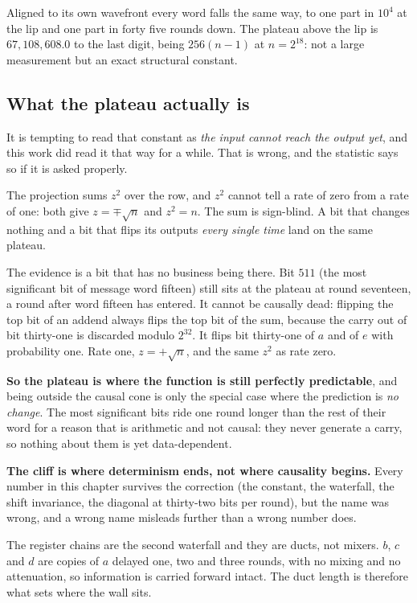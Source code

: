 Aligned to its own wavefront every word falls the same way, to one part in \(10^{4}\) at the lip and
one part in forty five rounds down. The plateau above the lip is \(67{,}108{,}608.0\) to the last
digit, being \(256(n-1)\) at \(n = 2^{18}\): not a large measurement but an exact structural
constant.

\subsection{What the plateau actually is}

It is tempting to read that constant as \emph{the input cannot reach the output yet}, and this work
did read it that way for a while. That is wrong, and the statistic says so if it is asked properly.

The projection sums \(z^{2}\) over the row, and \(z^{2}\) cannot tell a rate of zero from a rate of
one: both give \(z = \mp\sqrt{n}\) and \(z^{2} = n\). The sum is sign-blind. A bit that changes
nothing and a bit that flips its outputs \emph{every single time} land on the same plateau.

The evidence is a bit that has no business being there. Bit \(511\) (the most significant bit of
message word fifteen) still sits at the plateau at round seventeen, a round after word fifteen
has entered. It cannot be causally dead: flipping the top bit of an addend always flips the top bit
of the sum, because the carry out of bit thirty-one is discarded modulo \(2^{32}\). It flips bit
thirty-one of \(a\) and of \(e\) with probability one. Rate one, \(z = +\sqrt{n}\), and the same
\(z^{2}\) as rate zero.

\textbf{So the plateau is where the function is still perfectly predictable}, and being outside the
causal cone is only the special case where the prediction is \emph{no change}. The most significant
bits ride one round longer than the rest of their word for a reason that is arithmetic and not
causal: they never generate a carry, so nothing about them is yet data-dependent.

\textbf{The cliff is where determinism ends, not where causality begins.} Every number in this
chapter survives the correction (the constant, the waterfall, the shift invariance, the diagonal
at thirty-two bits per round), but the name was wrong, and a wrong name misleads further than a
wrong number does.

The register chains are the second waterfall and they are ducts, not mixers. \(b\), \(c\)
and \(d\) are copies of \(a\) delayed one, two and three rounds, with no mixing and no attenuation,
so information is carried forward intact. The duct length is therefore what sets where the wall
sits.

